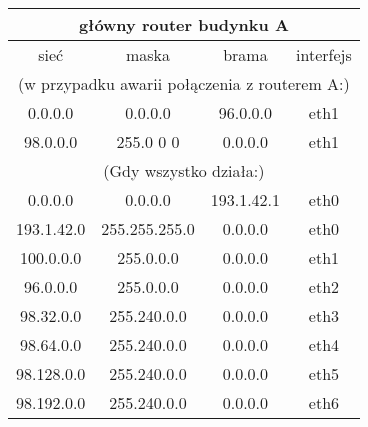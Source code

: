 \begin{tabular}{|c|c|c|c|}
    \hline
        \multicolumn{4}{|c|}{\textbf{główny router budynku A}} \\
    \hline
        sieć & maska & brama & interfejs \\
    \hline
        \multicolumn{4}{|c|}{(w przypadku awarii połączenia z routerem A:)} \\
        0.0.0.0     &   0.0.0.0         &   96.0.0.0    &   eth1    \\
        98.0.0.0    &   255.0 0 0       &   0.0.0.0     &   eth1    \\
    \hline
        \multicolumn{4}{|c|}{(Gdy wszystko działa:)} \\
        0.0.0.0     &   0.0.0.0         &   193.1.42.1  &   eth0    \\
        193.1.42.0  &   255.255.255.0   &   0.0.0.0     &   eth0    \\
    \hline
        100.0.0.0   &   255.0.0.0       &   0.0.0.0     &   eth1    \\
        96.0.0.0    &   255.0.0.0       &   0.0.0.0     &   eth2    \\
        98.32.0.0   &   255.240.0.0     &   0.0.0.0     &   eth3    \\
        98.64.0.0   &   255.240.0.0     &   0.0.0.0     &   eth4    \\
        98.128.0.0  &   255.240.0.0     &   0.0.0.0     &   eth5    \\
        98.192.0.0  &   255.240.0.0     &   0.0.0.0     &   eth6    \\
    
    \hline
    
\end{tabular}